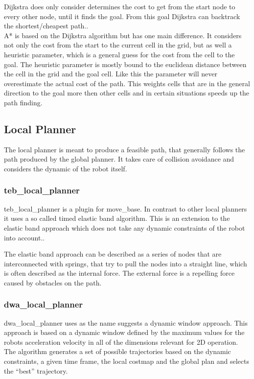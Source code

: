 Dijkstra does only consider determines the cost to get from the start node to every other node, until it finds the goal. From this goal Dijkstra can backtrack the shortest/cheapest path.\cite{AlgorithmenundDatenstrukturen}.\\

A* is based on the Dijkstra algorithm but has one main difference. It considers not only the cost from the start to the current cell in the grid, but as well a heuristic parameter, which is a general guess for the cost from the cell to the goal. The heuristic parameter is mostly bound to the euclidean distance between the cell in the grid and the goal cell. Like this the parameter will never overestimate the actual cost of the path\cite{AlgorithmenundDatenstrukturen}. This weights cells that are in the general direction to the goal more then other cells and in certain situations speeds up the path finding.\\

\subsection{Local Planner}
The local planner is meant to produce a feasible path, that generally follows the path produced by the global planner. It takes care of collision avoidance and considers the dynamic of the robot itself.

\subsubsection{teb\_local\_planner}
teb\_local\_planner is a plugin for move\_base. In contrast to other local planners it uses a so called timed elastic band algorithm. This is an extension to the elastic band approach which does not take any dynamic constraints of the robot into account.\cite{Rsmann2012TrajectoryMC}.

The elastic band approach can be described as a series of nodes that are interconnected with springs, that try to pull the nodes into a straight line, which is often described as the internal force. The external force is a repelling force caused by obstacles on the path\cite{elasticband}.

\subsubsection{dwa\_local\_planner}
dwa\_local\_planner uses as the name suggests a dynamic window approach. This approach is based on a dynamic window defined by the maximum values for the robots acceleration velocity in all of the dimensions relevant for 2D operation.\\
The algorithm generates a set of possible trajectories based on the dynamic constraints, a given time frame, the local costmap and the global plan and selects the ``best'' trajectory\cite{dwa}.

